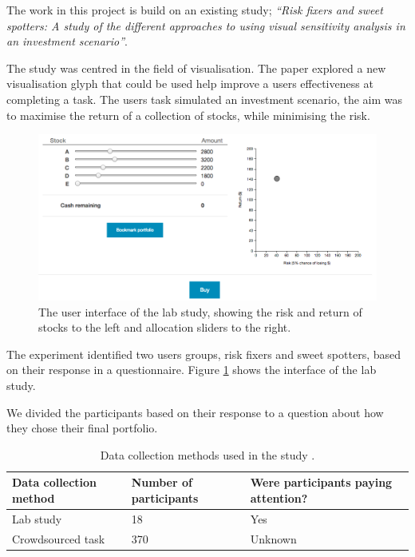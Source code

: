 \documentclass{article}
\begin{document}
The work in this project is build on an existing study;
\textit{``Risk fixers and sweet spotters: A study of the different approaches
to using visual sensitivity analysis in an investment scenario''}\cite{torsney2018risk}.

The study was centred in the field of visualisation.
The paper explored a new visualisation glyph that could be used help improve a users effectiveness at completing a task.
The users task simulated an investment scenario, the aim was to maximise the return of a collection of stocks, while minimising the risk. 

\begin{figure}[ht]
    \centering
    \includegraphics[scale=0.3, frame]{Images/interface.png}
    \caption{The user interface of the lab study, showing the risk and return of stocks to the left and allocation sliders to the right.}
    \label{fig:interface}
\end{figure}

The experiment identified two users groups, risk fixers and sweet spotters, based on their response in a questionnaire.
Figure \ref{fig:interface} shows the interface of the lab study.

We divided the participants based on their response to a question
about how they chose their final portfolio. 


\begin{table}[ht]
    \caption{\label{table:studies} Data collection methods used in the study \cite{torsney2018risk}.}
    \small
    \begin{tabular}{lll}
        \hline
        Data collection method & Number of participants & Were participants paying attention? \\    \hline
        Lab study              & 18                     & Yes                                 \\
        Crowdsourced task      & 370                    & Unknown                             \\    \hline
    \end{tabular}
\end{table}
\end{document}
